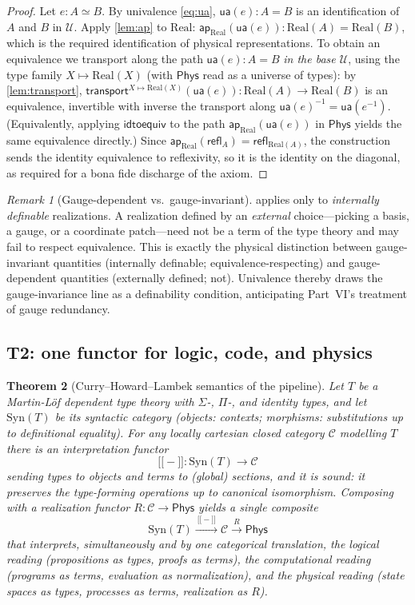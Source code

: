 \documentclass[12pt]{article}
\newtheorem{theorem}{Theorem}[section]
\theoremstyle{definition}
\theoremstyle{remark}
\newtheorem{remark}[theorem]{Remark}
\newcommand{\Phys}{\mathsf{Phys}}
\newcommand{\Real}{\mathrm{Real}}
\newcommand{\Univ}{\mathcal{U}}
\newcommand{\Refl}{\mathsf{refl}}
\newcommand{\ua}{\mathsf{ua}}
\newcommand{\idtoequiv}{\mathsf{idtoequiv}}
\newcommand{\transport}{\mathsf{transport}}
\newcommand{\ap}{\mathsf{ap}}
\newcommand{\llbracket}{\mathopen{[\![}}
\newcommand{\rrbracket}{\mathclose{]\!]}}
\begin{document}
\begin{proof}
Let $e:A\simeq B$. By univalence \eqref{eq:ua}, $\ua(e):A=B$ is an
identification of $A$ and $B$ in $\Univ$. Apply \cref{lem:ap} to $\Real$:
$\ap_{\Real}(\ua(e)):\Real(A)=\Real(B)$, which is the required identification of
physical representations. To obtain an equivalence we transport along the path
$\ua(e):A=B$ \emph{in the base $\Univ$}, using the type family
$X\mapsto\Real(X)$ (with $\Phys$ read as a universe of types): by
\cref{lem:transport}, $\transport^{X\mapsto\Real(X)}(\ua(e)):\Real(A)\to
\Real(B)$ is an equivalence, invertible with inverse the transport along
$\ua(e)^{-1}=\ua(e^{-1})$. (Equivalently, applying $\idtoequiv$ to the path
$\ap_{\Real}(\ua(e))$ in $\Phys$ yields the same equivalence directly.) Since
$\ap_{\Real}(\Refl_A)=\Refl_{\Real(A)}$,
the construction sends the identity equivalence to reflexivity, so it is the
identity on the diagonal, as required for a bona fide discharge of the axiom.
\end{proof}

\begin{remark}[Gauge-dependent vs.\ gauge-invariant]
\label{rem:gauge-invariance}
 applies only to \emph{internally definable} realizations.
A realization defined by an \emph{external} choice---picking a basis, a gauge, or
a coordinate patch---need not be a term of the type theory and may fail to
respect equivalence. This is exactly the physical distinction between
gauge-invariant quantities (internally definable; equivalence-respecting) and
gauge-dependent quantities (externally defined; not). Univalence thereby draws
the gauge-invariance line as a definability condition, anticipating Part~VI's
treatment of gauge redundancy.
\end{remark}

\subsection{T2: one functor for logic, code, and physics}

\begin{theorem}[Curry--Howard--Lambek semantics of the pipeline]
\label{thm:chl}
Let $T$ be a Martin-L\"of dependent type theory with $\Sigma$-, $\Pi$-, and
identity types, and let $\mathrm{Syn}(T)$ be its syntactic category (objects:
contexts; morphisms: substitutions up to definitional equality). For any locally
cartesian closed category $\mathcal{C}$ modelling $T$ there is an interpretation
functor
\[
\llbracket-\rrbracket:\mathrm{Syn}(T)\longrightarrow\mathcal{C}
\]
sending types to objects and terms to (global) sections, and it is sound: it
preserves the type-forming operations up to canonical isomorphism. Composing with
a realization functor $R:\mathcal{C}\to\Phys$ yields a single composite
\[
\mathrm{Syn}(T)\xrightarrow{\ \llbracket-\rrbracket\ }\mathcal{C}
\xrightarrow{\ R\ }\Phys
\]
that interprets, simultaneously and by one categorical translation, the logical
reading (propositions as types, proofs as terms), the computational reading
(programs as terms, evaluation as normalization), and the physical reading
(state spaces as types, processes as terms, realization as $R$).
\end{theorem}
\end{document}
